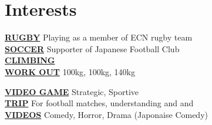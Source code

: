 \documentclass[]{deedy-resume-openfont}
\begin{document}
\begin{minipage}[t]{0.33\textwidth}
\section{Interests} 
 \vspace{1mm}
\underline{\textbf{RUGBY}} Playing as a member of ECN rugby team \\ \vspace{0.5mm}
\underline{\textbf{SOCCER}} Supporter of  Japanese Football Club\\ \vspace{0.5mm}
\underline{\textbf{CLIMBING}} \\ \vspace{0.5mm}
\underline{\textbf{WORK OUT}}  100kg,  100kg,  140kg \\
\sectionsep

 \vspace{1mm}
\underline{\textbf{VIDEO GAME}} Strategic, Sportive\\ \vspace{0.5mm}
\underline{\textbf{TRIP}} For football matches, understanding  and  and \\ \vspace{0.5mm}
\underline{\textbf{VIDEOS}} Comedy, Horror, Drama
(Japonaise Comedy)

\sectionsep



%
%

\end{minipage} 
\hfill
\end{document}

